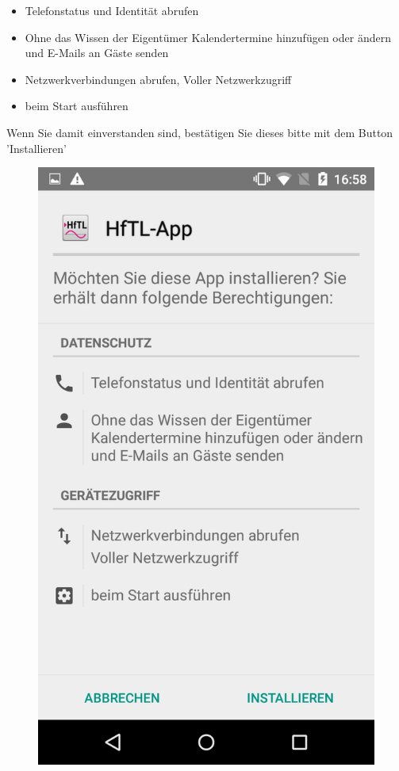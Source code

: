 \begin{itemize}
	\item Telefonstatus und Identität abrufen
	\item Ohne das Wissen der Eigentümer Kalendertermine hinzufügen oder ändern und E-Mails an Gäste senden
	\item Netzwerkverbindungen abrufen, Voller Netzwerkzugriff
	\item beim Start ausführen
\end{itemize}

Wenn Sie damit einverstanden sind, bestätigen Sie dieses bitte mit dem Button 'Installieren'


\begin{figure}[h]
	\centering
	\includegraphics[scale=0.25]{03_Bedienungsanleitung/img/berechtigungen.png}
\end{figure}

